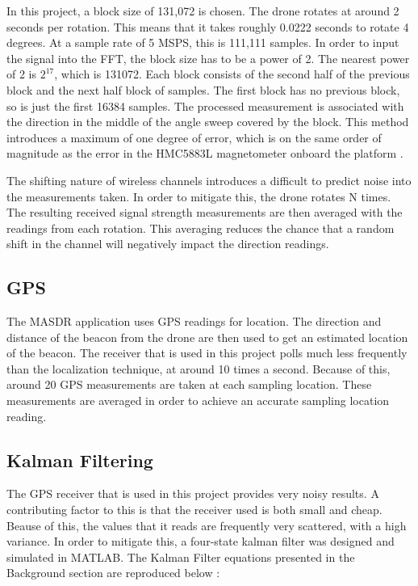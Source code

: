 In this project, a block size of 131,072 is chosen. The drone rotates at around 2 seconds per rotation. This means that it takes roughly 0.0222 seconds to rotate 4 degrees. At a sample rate of 5 MSPS, this is 111,111 samples. In order to input the signal into the FFT, the block size has to be a power of 2. The nearest power of 2 is $2^{17}$, which is 131072. Each block consists of the second half of the previous block and the next half block of samples. The first block has no previous block, so is just the first 16384 samples. The processed measurement is associated with the direction in the middle of the angle sweep covered by the block. This method introduces a maximum of one degree of error, which is on the same order of magnitude as the error in the HMC5883L magnetometer onboard the platform \cite{magnetometer_data}. \par 
The shifting nature of wireless channels introduces a difficult to predict noise into the measurements taken. In order to mitigate this, the drone rotates N times. The resulting received signal strength measurements are then averaged with the readings from each rotation. This averaging reduces the chance that a random shift in the channel will negatively impact the direction readings. \par 

\subsection{GPS}
The MASDR application uses GPS readings for location. The direction and distance of the beacon from the drone are then used to get an estimated location of the beacon. The receiver that is used in this project polls much less frequently than the localization technique, at around 10 times a second. Because of this, around 20 GPS measurements are taken at each sampling location. These measurements are averaged in order to achieve an accurate sampling location reading.\par
 \subsection{Kalman Filtering}\label{methods:kf}
 The GPS receiver that is used in this project provides very noisy results. A contributing factor to this is that the receiver used is both small and cheap. Beause of this, the values that it reads are frequently very scattered, with a high variance. In order to mitigate this, a four-state kalman filter was designed and simulated in MATLAB. The Kalman Filter equations presented in the Background section are reproduced below \cite{kf_book}: \par

